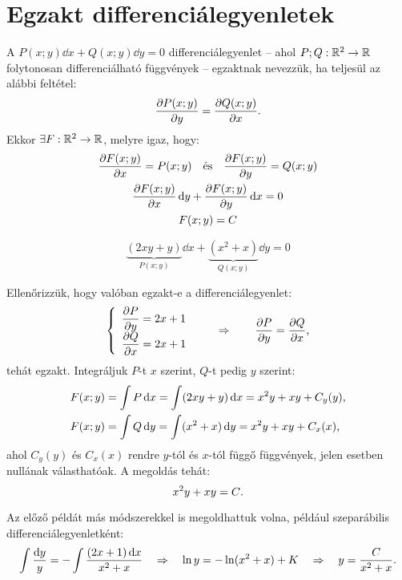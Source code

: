 \clearpage
\section{Egzakt differenciálegyenletek}

\begin{definition}
  A $P(x;y) \dd x + Q(x;y) \dd y = 0$ differenciálegyenlet -- ahol
  $P;Q : \mathbb{R}^2 \rightarrow \mathbb{R}$ folytonosan differenciálható függvények
  -- egzaktnak nevezzük, ha teljesül az alábbi feltétel:
  $$
    \pdv{P(x;y)}{y} = \pdv{Q(x;y)}{x}
    \text.
  $$
  Ekkor $\exists F : \mathbb{R}^2 \rightarrow \mathbb{R}$, melyre igaz, hogy:
  \begin{gather*}
    \pdv{F(x;y)}{x} = P(x;y)
    \quad \text{és} \quad
    \pdv{F(x;y)}{y} = Q(x;y)
    \\
    \pdv{F(x;y)}{x}   \mathop{}\!\mathrm{d} y
    + \pdv{F(x;y)}{y} \mathop{}\!\mathrm{d} x
    = 0
    \\
    F(x;y) = C
  \end{gather*}
\end{definition}

\begin{example}
  $$
    \underbrace{(2xy + y)}_{P(x; y)} \dd x + \underbrace{(x^2 + x)}_{Q(x; y)} \dd y = 0
  $$
  \boxrule

  Ellenőrizzük, hogy valóban egzakt-e a differenciálegyenlet:
  $$
    \left\{
    \begin{array}{l}
      \displaystyle\pdv{P}{y}  = 2x + 1
      \\[.33em]
      \displaystyle \pdv{Q}{x} = 2x + 1
    \end{array}
    \right.
    \qquad \Rightarrow \qquad
    \pdv{P}{y} = \pdv{Q}{x}
    \text,
  $$
  tehát egzakt. Integráljuk $P$-t $x$ szerint, $Q$-t pedig $y$ szerint:
  \begin{align*}
    F(x;y) & = \int P \mathop{}\!\mathrm{d} x = \int (2xy + y) \mathop{}\!\mathrm{d} x
    = x^2 y + xy + C_y(y)
    \text,
    \\
    F(x;y) & = \int Q \mathop{}\!\mathrm{d} y = \int (x^2 + x) \mathop{}\!\mathrm{d} y
    = x^2 y + xy + C_x(x)
    \text,
  \end{align*}
  ahol $C_y(y)$ és $C_x(x)$ rendre $y$-tól és $x$-tól függő függvények,
  jelen esetben nullának válasthatóak. A megoldás tehát:
  $$
    x^2 y + xy = C
    \text.
  $$
\end{example}

\begin{note}
  Az előző példát más módszerekkel is megoldhattuk volna, például szeparábilis
  differenciálegyenletként:
  $$
    \int\frac{\mathop{}\!\mathrm{d} y}{y}
    = - \int\frac{(2x + 1)\mathop{}\!\mathrm{d} x}{x^2 + x}
    \quad \Rightarrow \quad
    \ln y = -\ln(x^2 + x) + K
    \quad \Rightarrow \quad
    y = \frac{C}{x^2 + x}
    \text.
  $$
\end{note}

